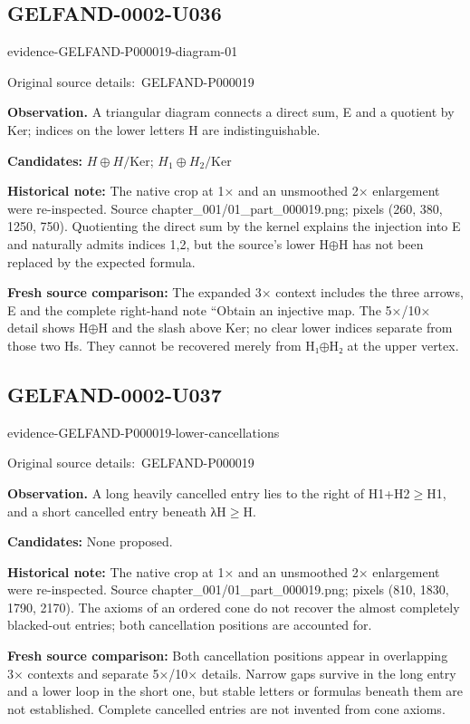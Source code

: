 \documentclass[11pt]{article}
\newcommand{\EvidenceBlock}[4]{%
 \par\smallskip\noindent\begin{minipage}{\linewidth}
 \begin{minipage}[t]{.47\linewidth}\vspace{0pt}\centering
 \csname evidence-#1-#2\endcsname\par
 {\scriptsize\SourceCropCaption\ #1}\par
 \end{minipage}\hfill
 \begin{minipage}[t]{.49\linewidth}\vspace{0pt}\raggedright
 {\small\color{orange!65!black}\textbf{#4} #3}\par
 \end{minipage}
 \end{minipage}\par\smallskip}
\newcommand{\SourceCropCaption}{Original source details:}\newcommand{\ReadingCaption}{Uncertain reading.}\newcommand{\IncompleteCaption}{Undeciphered passage.}\newcommand{\DiagramCaption}{Diagram and typed description.}
\begin{document}
\subsection*{GELFAND-0002-U036}
\EvidenceBlock{GELFAND-P000019}{diagram-01}{A triangular diagram connects a direct sum, E and a quotient by Ker; indices on the lower letters H are indistinguishable.}{Observation.}
\par\smallskip\noindent\textbf{Candidates: } \(H\oplus H/\mathrm{Ker}\); \(H_1\oplus H_2/\mathrm{Ker}\)\par
\par\smallskip\noindent\textbf{Historical note: } The native crop at 1× and an unsmoothed 2× enlargement were re-inspected. Source chapter\_001/01\_part\_000019.png; pixels (260, 380, 1250, 750). Quotienting the direct sum by the kernel explains the injection into E and naturally admits indices 1,2, but the source’s lower H\(\oplus\)H has not been replaced by the expected formula.\par
\par\smallskip\noindent\textbf{Fresh source comparison: } The expanded 3× context includes the three arrows, E and the complete right-hand note ``Obtain an injective map. The 5×/10× detail shows H\(\oplus\)H and the slash above Ker; no clear lower indices separate from those two Hs. They cannot be recovered merely from H₁\(\oplus\)H₂ at the upper vertex.\par

\subsection*{GELFAND-0002-U037}
\EvidenceBlock{GELFAND-P000019}{lower-cancellations}{A long heavily cancelled entry lies to the right of H1+H2\(\ge\)H1, and a short cancelled entry beneath λH\(\ge\)H.}{Observation.}
\par\smallskip\noindent\textbf{Candidates: } None proposed.\par
\par\smallskip\noindent\textbf{Historical note: } The native crop at 1× and an unsmoothed 2× enlargement were re-inspected. Source chapter\_001/01\_part\_000019.png; pixels (810, 1830, 1790, 2170). The axioms of an ordered cone do not recover the almost completely blacked-out entries; both cancellation positions are accounted for.\par
\par\smallskip\noindent\textbf{Fresh source comparison: } Both cancellation positions appear in overlapping 3× contexts and separate 5×/10× details. Narrow gaps survive in the long entry and a lower loop in the short one, but stable letters or formulas beneath them are not established. Complete cancelled entries are not invented from cone axioms.\par
\end{document}
